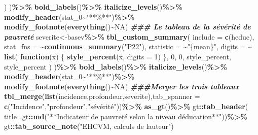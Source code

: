 \documentclass[
]{article}
\newenvironment{Shaded}{\begin{snugshade}}{\end{snugshade}}
\newcommand{\AttributeTok}[1]{\textcolor[rgb]{0.13,0.29,0.53}{#1}}
\newcommand{\ConstantTok}[1]{\textcolor[rgb]{0.56,0.35,0.01}{#1}}
\newcommand{\ControlFlowTok}[1]{\textcolor[rgb]{0.13,0.29,0.53}{\textbf{#1}}}
\newcommand{\DecValTok}[1]{\textcolor[rgb]{0.00,0.00,0.81}{#1}}
\newcommand{\DocumentationTok}[1]{\textcolor[rgb]{0.56,0.35,0.01}{\textbf{\textit{#1}}}}
\newcommand{\FunctionTok}[1]{\textcolor[rgb]{0.13,0.29,0.53}{\textbf{#1}}}
\newcommand{\NormalTok}[1]{#1}
\newcommand{\OtherTok}[1]{\textcolor[rgb]{0.56,0.35,0.01}{#1}}
\newcommand{\SpecialCharTok}[1]{\textcolor[rgb]{0.81,0.36,0.00}{\textbf{#1}}}
\newcommand{\StringTok}[1]{\textcolor[rgb]{0.31,0.60,0.02}{#1}}
\begin{document}
\begin{Shaded}
\begin{Highlighting}[]
\NormalTok{    )}
\NormalTok{)}\SpecialCharTok{\%\textgreater{}\%}
  \FunctionTok{bold\_labels}\NormalTok{()}\SpecialCharTok{\%\textgreater{}\%} 
  \FunctionTok{italicize\_levels}\NormalTok{()}\SpecialCharTok{\%\textgreater{}\%} 
  \FunctionTok{modify\_header}\NormalTok{(stat\_0}\SpecialCharTok{\textasciitilde{}}\StringTok{"**\%**"}\NormalTok{)}\SpecialCharTok{\%\textgreater{}\%}
  \FunctionTok{modify\_footnote}\NormalTok{(}\FunctionTok{everything}\NormalTok{()}\SpecialCharTok{\textasciitilde{}}\ConstantTok{NA}\NormalTok{)}
\DocumentationTok{\#\#\# Le tableau de la sévérité de pauvreté}
\NormalTok{severite}\OtherTok{\textless{}{-}}\NormalTok{basev}\SpecialCharTok{\%\textgreater{}\%}
  \FunctionTok{tbl\_custom\_summary}\NormalTok{(}
  \AttributeTok{include =} \FunctionTok{c}\NormalTok{(heduc),}
  \AttributeTok{stat\_fns =} \SpecialCharTok{\textasciitilde{}}\FunctionTok{continuous\_summary}\NormalTok{(}\StringTok{"P22"}\NormalTok{),}
  \AttributeTok{statistic =} \SpecialCharTok{\textasciitilde{}}\StringTok{"\{mean\}"}\NormalTok{,}
  \AttributeTok{digits =} \SpecialCharTok{\textasciitilde{}} \FunctionTok{list}\NormalTok{(}
      \ControlFlowTok{function}\NormalTok{(x) \{}
        \FunctionTok{style\_percent}\NormalTok{(x, }\AttributeTok{digits =} \DecValTok{1}\NormalTok{)}
\NormalTok{      \},}
      \DecValTok{0}\NormalTok{, }\DecValTok{0}\NormalTok{, style\_percent, style\_percent}
\NormalTok{    )}
\NormalTok{)}\SpecialCharTok{\%\textgreater{}\%}
  \FunctionTok{bold\_labels}\NormalTok{()}\SpecialCharTok{\%\textgreater{}\%} 
  \FunctionTok{italicize\_levels}\NormalTok{()}\SpecialCharTok{\%\textgreater{}\%} 
  \FunctionTok{modify\_header}\NormalTok{(stat\_0}\SpecialCharTok{\textasciitilde{}}\StringTok{"**\%**"}\NormalTok{)}\SpecialCharTok{\%\textgreater{}\%}
  \FunctionTok{modify\_footnote}\NormalTok{(}\FunctionTok{everything}\NormalTok{()}\SpecialCharTok{\textasciitilde{}}\ConstantTok{NA}\NormalTok{)}
\DocumentationTok{\#\#\#Merger les trois tableaux}
\FunctionTok{tbl\_merge}\NormalTok{(}\FunctionTok{list}\NormalTok{(incidence,profondeur,severite),}\AttributeTok{tab\_spanner =} 
            \FunctionTok{c}\NormalTok{(}\StringTok{"Incidence"}\NormalTok{,}\StringTok{"profondeur"}\NormalTok{,}\StringTok{"sévérité"}\NormalTok{))}\SpecialCharTok{\%\textgreater{}\%}
  \FunctionTok{as\_gt}\NormalTok{()}\SpecialCharTok{\%\textgreater{}\%}
\NormalTok{  gt}\SpecialCharTok{::}\FunctionTok{tab\_header}\NormalTok{(}
    \AttributeTok{title=}\NormalTok{gt}\SpecialCharTok{::}\FunctionTok{md}\NormalTok{(}\StringTok{"**Indicateur de pauvreté selon la niveau }
\StringTok{                 d\textquotesingle{}éducation**"}\NormalTok{))}\SpecialCharTok{\%\textgreater{}\%}
\NormalTok{  gt}\SpecialCharTok{::}\FunctionTok{tab\_source\_note}\NormalTok{(}\StringTok{"EHCVM, calculs de l\textquotesingle{}auteur"}\NormalTok{)}
\end{Highlighting}
\end{Shaded}
\end{document}
